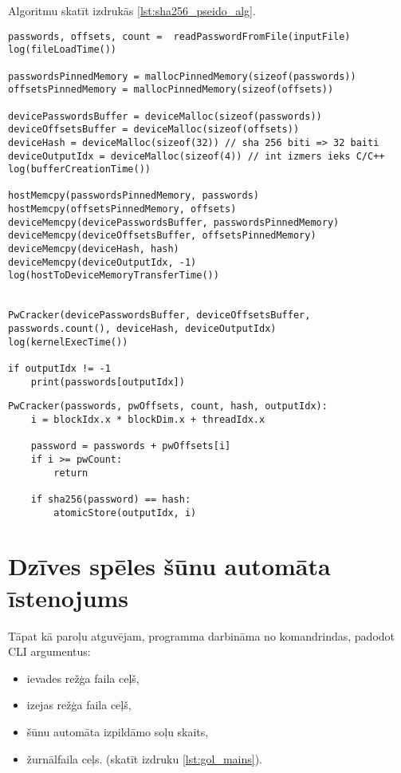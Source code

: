 Algoritmu skatīt izdrukās \ref{lst:sha256_pseido_alg}.
\begin{lstlisting}[caption={Paroļu atguvēja CPU puses pseidokods}, label=lst:sha256_pseido_alg]
passwords, offsets, count =  readPasswordFromFile(inputFile)
log(fileLoadTime())

passwordsPinnedMemory = mallocPinnedMemory(sizeof(passwords))
offsetsPinnedMemory = mallocPinnedMemory(sizeof(offsets))

devicePasswordsBuffer = deviceMalloc(sizeof(passwords))
deviceOffsetsBuffer = deviceMalloc(sizeof(offsets))
deviceHash = deviceMalloc(sizeof(32)) // sha 256 biti => 32 baiti
deviceOutputIdx = deviceMalloc(sizeof(4)) // int izmers ieks C/C++
log(bufferCreationTime())

hostMemcpy(passwordsPinnedMemory, passwords)
hostMemcpy(offsetsPinnedMemory, offsets)
deviceMemcpy(devicePasswordsBuffer, passwordsPinnedMemory)
deviceMemcpy(deviceOffsetsBuffer, offsetsPinnedMemory)
deviceMemcpy(deviceHash, hash)
deviceMemcpy(deviceOutputIdx, -1)
log(hostToDeviceMemoryTransferTime())


PwCracker(devicePasswordsBuffer, deviceOffsetsBuffer, passwords.count(), deviceHash, deviceOutputIdx)
log(kernelExecTime())

if outputIdx != -1
    print(passwords[outputIdx])
\end{lstlisting}


\begin{lstlisting}[caption={Paroļu atguvēja GPGPU kodola pseidokods}, label=lst:sha256_pseido_alg_device]
PwCracker(passwords, pwOffsets, count, hash, outputIdx):
    i = blockIdx.x * blockDim.x + threadIdx.x

    password = passwords + pwOffsets[i]
    if i >= pwCount:
        return

    if sha256(password) == hash:
        atomicStore(outputIdx, i)
\end{lstlisting}

\section{Dzīves spēles šūnu automāta īstenojums} \label{gol_section}

Tāpat kā paroļu atguvējam, programma darbināma no komandrindas, padodot CLI
argumentus:
\begin{itemize}
    \item ievades režģa faila ceļš,
    \item izejas režģa faila ceļš,
    \item šūnu automāta izpildāmo soļu skaits,
    \item žurnālfaila ceļs. (skatīt izdruku \ref{lst:gol_mains}).
\end{itemize}

